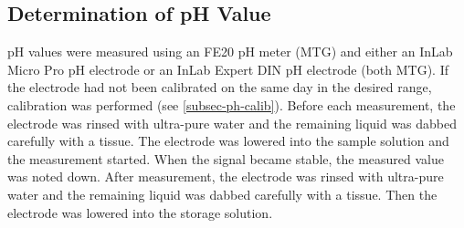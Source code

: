 \subsection{Determination of pH Value}
pH values were measured using an FE20 pH meter (MTG) and either an InLab Micro Pro pH electrode or an InLab Expert DIN pH electrode (both MTG). If the electrode had not been calibrated on the same day in the desired range, calibration was performed (see \vref{subsec-ph-calib}). Before each measurement, the electrode was rinsed with ultra-pure water and the remaining liquid was dabbed carefully with a tissue. The electrode was lowered into the sample solution and the measurement started. When the signal became stable, the measured value was noted down. After measurement, the electrode was rinsed with ultra-pure water and the remaining liquid was dabbed carefully with a tissue. Then the electrode was lowered into the storage solution.

